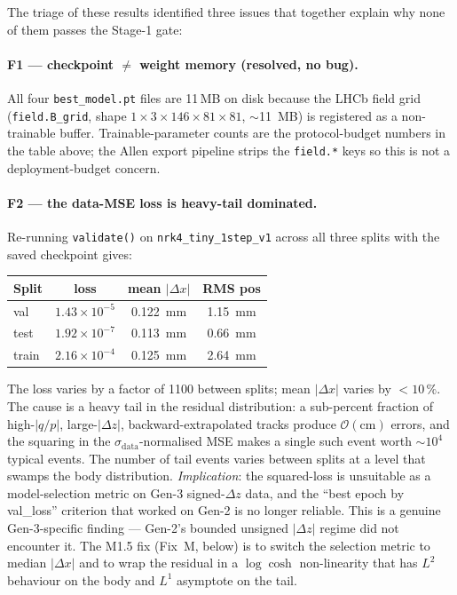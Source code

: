 \documentclass[a4paper,11pt]{article}
\newcommand{\SI}[2]{#1~#2}
\newcommand{\num}[1]{#1}
\newcommand{\byte}{B}
\newcommand{\mega}{M}
\newcommand{\mm}{mm}
\newcommand{\dz}{\Delta z}
\begin{document}
\noindent The triage of these results identified three issues
that together explain why none of them passes the Stage-1 gate:

\paragraph{F1 --- checkpoint $\neq$ weight memory (resolved, no
bug).}  All four \texttt{best\_model.pt} files are 11\,MB on disk
because the LHCb field grid (\texttt{field.B\_grid}, shape
$1\times 3\times 146\times 81\times 81$, $\sim$\SI{11}{\mega\byte})
is registered as a non-trainable buffer.  Trainable-parameter
counts are the protocol-budget numbers in the table above; the
Allen export pipeline strips the \texttt{field.*} keys so this is
not a deployment-budget concern.

\paragraph{F2 --- the data-MSE loss is heavy-tail dominated.}
Re-running \texttt{validate()} on \texttt{nrk4\_tiny\_1step\_v1}
across all three splits with the saved checkpoint gives:

\begin{center}
\small
\begin{tabular}{lccc}
\toprule
Split & loss & mean $|\Delta x|$ & RMS pos\\
\midrule
val   & $1.43\!\times\!10^{-5}$ & \SI{0.122}{\mm} & \SI{1.15}{\mm}\\
test  & $1.92\!\times\!10^{-7}$ & \SI{0.113}{\mm} & \SI{0.66}{\mm}\\
train & $2.16\!\times\!10^{-4}$ & \SI{0.125}{\mm} & \SI{2.64}{\mm}\\
\bottomrule
\end{tabular}
\end{center}

The loss varies by a factor of \num{1100} between splits; mean
$|\Delta x|$ varies by $<10\,\%$.  The cause is a heavy tail in the
residual distribution: a sub-percent fraction of high-$|q/p|$,
large-$|\dz|$, backward-extrapolated tracks produce
$\mathcal{O}(\mathrm{cm})$ errors, and the squaring in the
$\sigma_\mathrm{data}$-normalised MSE makes a single such event
worth $\sim 10^4$ typical events.  The number of tail events
varies between splits at a level that swamps the body
distribution.  \emph{Implication}: the squared-loss is unsuitable
as a model-selection metric on Gen-3 signed-$\dz$ data, and the
``best epoch by val\_loss'' criterion that worked on Gen-2 is no
longer reliable.  This is a genuine Gen-3-specific finding ---
Gen-2's bounded unsigned $|\dz|$ regime did not encounter it.
The M1.5 fix (Fix~M, below) is to switch the selection metric to
median $|\Delta x|$ and to wrap the residual in a $\log\cosh$
non-linearity that has $L^2$ behaviour on the body and $L^1$
asymptote on the tail.
\end{document}
